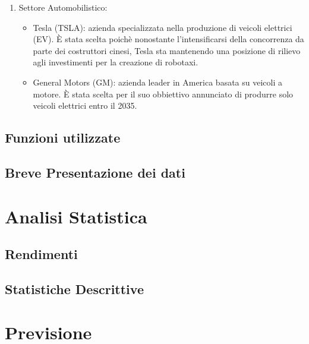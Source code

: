 \documentclass[11pt, a4paper]{report} %
\begin{document}
\begin{enumerate}
    Inoltre entrambi sono state scelte per analizzare i trend del settore energetico nei periodo di tensioni geopolitiche, come la guerra in Ucraina e Iran e per il trend di calo durante la pandemia, essendo il settore energetico quello più colpito, visto le diminuzione di domanda del petrolio.

    \item Settore Automobilistico: 
    \begin{itemize}
        \item Tesla (TSLA): azienda specializzata nella produzione di veicoli elettrici (EV). È stata scelta poichè nonostante l'intensificarsi della concorrenza da parte dei costruttori cinesi, Tesla sta mantenendo una posizione di rilievo agli investimenti per la creazione di robotaxi.
        \item General Motors (GM): azienda leader in America basata su veicoli a motore. È stata scelta per il suo obbiettivo annunciato di produrre solo veicoli elettrici entro il 2035.
    \end{itemize}
\end{enumerate}

\section{Funzioni utilizzate}

\section{Breve Presentazione dei dati}



\chapter{Analisi Statistica}

\section{Rendimenti}

\section{Statistiche Descrittive}



\chapter{Previsione}
\end{document}
